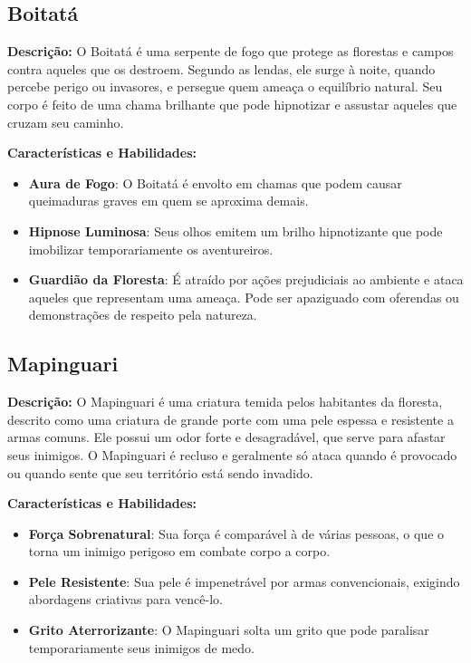 \subsection{Boitatá}

\textbf{Descrição:}  
O Boitatá é uma serpente de fogo que protege as florestas e campos contra aqueles que os destroem. Segundo as lendas, ele surge à noite, quando percebe perigo ou invasores, e persegue quem ameaça o equilíbrio natural. Seu corpo é feito de uma chama brilhante que pode hipnotizar e assustar aqueles que cruzam seu caminho.

\textbf{Características e Habilidades:}
\begin{itemize}
    \item \textbf{Aura de Fogo}: O Boitatá é envolto em chamas que podem causar queimaduras graves em quem se aproxima demais.
    \item \textbf{Hipnose Luminosa}: Seus olhos emitem um brilho hipnotizante que pode imobilizar temporariamente os aventureiros.
    \item \textbf{Guardião da Floresta}: É atraído por ações prejudiciais ao ambiente e ataca aqueles que representam uma ameaça. Pode ser apaziguado com oferendas ou demonstrações de respeito pela natureza.
\end{itemize}

\subsection{Mapinguari}

\textbf{Descrição:}  
O Mapinguari é uma criatura temida pelos habitantes da floresta, descrito como uma criatura de grande porte com uma pele espessa e resistente a armas comuns. Ele possui um odor forte e desagradável, que serve para afastar seus inimigos. O Mapinguari é recluso e geralmente só ataca quando é provocado ou quando sente que seu território está sendo invadido.

\textbf{Características e Habilidades:}
\begin{itemize}
    \item \textbf{Força Sobrenatural}: Sua força é comparável à de várias pessoas, o que o torna um inimigo perigoso em combate corpo a corpo.
    \item \textbf{Pele Resistente}: Sua pele é impenetrável por armas convencionais, exigindo abordagens criativas para vencê-lo.
    \item \textbf{Grito Aterrorizante}: O Mapinguari solta um grito que pode paralisar temporariamente seus inimigos de medo.
\end{itemize}

